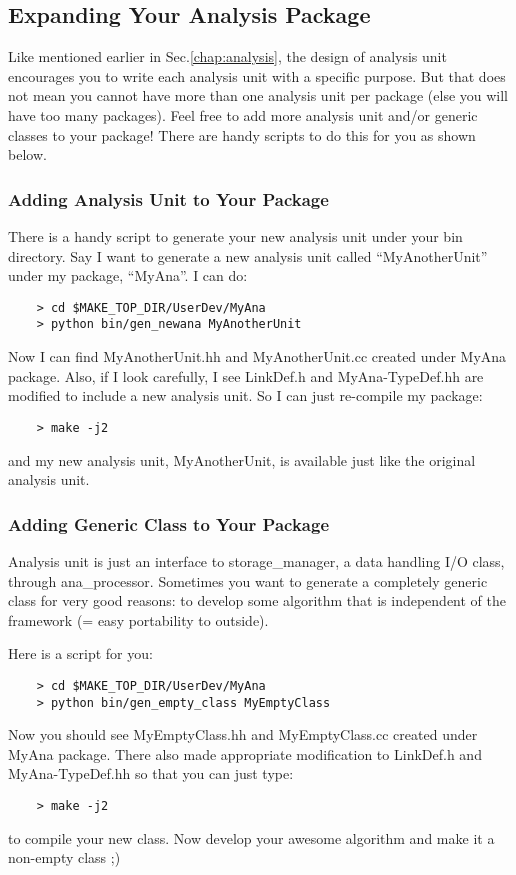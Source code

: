 \subsection{Expanding Your Analysis Package}
Like mentioned earlier in Sec.\ref{chap:analysis}, the design of analysis unit encourages you to write
each analysis unit with a specific purpose. But that does not mean you cannot have more than one
analysis unit per package (else you will have too many packages). Feel free to add more analysis unit 
and/or generic \CPP classes to your package! There are handy scripts to do this for you as shown below.

\subsubsection{Adding Analysis Unit to Your Package}
There is a handy script to generate your new analysis unit under your {\ttfamily bin} directory. 
Say I want to generate a new analysis unit called ``MyAnotherUnit'' under my package, ``MyAna''. 
I can do:
\begin{lstlisting}
    > cd $MAKE_TOP_DIR/UserDev/MyAna
    > python bin/gen_newana MyAnotherUnit
\end{lstlisting}
Now I can find {\ttfamily MyAnotherUnit.hh} and {\ttfamily MyAnotherUnit.cc} created under {\ttfamily MyAna}
package. Also, if I look carefully, I see {\ttfamily LinkDef.h} and {\ttfamily MyAna-TypeDef.hh} are modified
to include a new analysis unit. So I can just re-compile my package:
\begin{lstlisting}
    > make -j2
\end{lstlisting}
and my new analysis unit, {\ttfamily MyAnotherUnit}, is available just like the original analysis unit.

\subsubsection{Adding Generic \CPP Class to Your Package}
Analysis unit is just an interface to {\ttfamily storage\_manager}, a data handling I/O class, through
{\ttfamily ana\_processor}. Sometimes you want to generate a completely generic \CPP class for very good
reasons: to develop some algorithm that is independent of the framework (= easy portability to outside).

Here is a script for you:
\begin{lstlisting}
    > cd $MAKE_TOP_DIR/UserDev/MyAna
    > python bin/gen_empty_class MyEmptyClass
\end{lstlisting}
Now you should see {\ttfamily MyEmptyClass.hh} and {\ttfamily MyEmptyClass.cc} created under {\ttfamily MyAna}
package. There also made appropriate modification to {\ttfamily LinkDef.h} and {\ttfamily MyAna-TypeDef.hh}
so that you can just type:
\begin{lstlisting}
    > make -j2
\end{lstlisting}
to compile your new class. Now develop your awesome algorithm and make it a non-empty class ;)
